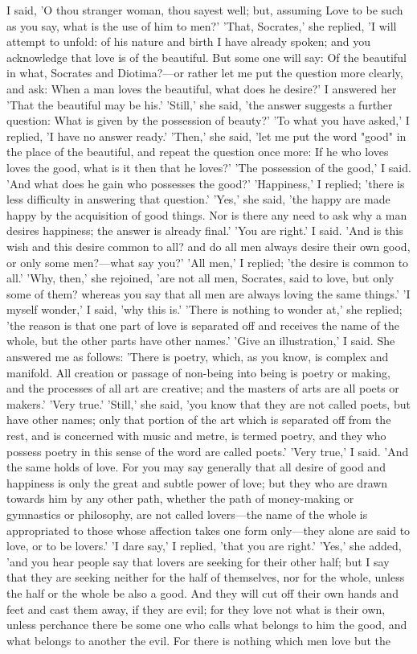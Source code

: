 \para[116] I said, 'O thou stranger woman, thou sayest well; but, assuming Love to be such as you say, what is the use of him to men?' 'That, Socrates,' she replied, 'I will attempt to unfold: of his nature and birth I have already spoken; and you acknowledge that love is of the beautiful. But some one will say: Of the beautiful in what, Socrates and Diotima?---or rather let me put the question more clearly, and ask: When a man loves the beautiful, what does he desire?' I answered her 'That the beautiful may be his.' 'Still,' she said, 'the answer suggests a further question: What is given by the possession of beauty?' 'To what you have asked,' I replied, 'I have no answer ready.' 'Then,' she said, 'let me put the word "good" in the place of the beautiful, and repeat the question once more: If he who loves loves the good, what is it then that he loves?' 'The possession of the good,' I said. 'And what does he gain who possesses the good?' 'Happiness,' I replied; 'there is less difficulty in answering that question.' 'Yes,' she said, 'the happy are made happy by the acquisition of good things. Nor is there any need to ask why a man desires happiness; the answer is already final.' 'You are right.' I said. 'And is this wish and this desire common to all? and do all men always desire their own good, or only some men?---what say you?' 'All men,' I replied; 'the desire is common to all.' 'Why, then,' she rejoined, 'are not all men, Socrates, said to love, but only some of them? whereas you say that all men are always loving the same things.' 'I myself wonder,' I said, 'why this is.' 'There is nothing to wonder at,' she replied; 'the reason is that one part of love is separated off and receives the name of the whole, but the other parts have other names.' 'Give an illustration,' I said. She answered me as follows: 'There is poetry, which, as you know, is complex and manifold. All creation or passage of non-being into being is poetry or making, and the processes of all art are creative; and the masters of arts are all poets or makers.' 'Very true.' 'Still,' she said, 'you know that they are not called poets, but have other names; only that portion of the art which is separated off from the rest, and is concerned with music and metre, is termed poetry, and they who possess poetry in this sense of the word are called poets.' 'Very true,' I said. 'And the same holds of love. For you may say generally that all desire of good and happiness is only the great and subtle power of love; but they who are drawn towards him by any other path, whether the path of money-making or gymnastics or philosophy, are not called lovers---the name of the whole is appropriated to those whose affection takes one form only---they alone are said to love, or to be lovers.' 'I dare say,' I replied, 'that you are right.' 'Yes,' she added, 'and you hear people say that lovers are seeking for their other half; but I say that they are seeking neither for the half of themselves, nor for the whole, unless the half or the whole be also a good. And they will cut off their own hands and feet and cast them away, if they are evil; for they love not what is their own, unless perchance there be some one who calls what belongs to him the good, and what belongs to another the evil. For there is nothing which men love but the 